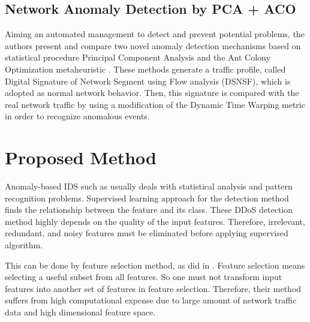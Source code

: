 \documentclass[a4paper]{article}
\begin{document}
%
%

\subsection{Network Anomaly Detection by PCA + ACO}
Aiming an automated management to detect and prevent potential problems, the authors present and compare two novel anomaly detection mechanisms based on statistical procedure Principal Component Analysis and the Ant Colony Optimization metaheuristic \cite{fernandes2016network}. These methods generate a traffic profile, called Digital Signature of Network Segment using Flow analysis (DSNSF), which is adopted as normal network behavior. Then, this signature is compared with the real network traffic by using a modification of the Dynamic Time Warping metric in order to recognize anomalous events. 
	
\section{Proposed Method}
Anomaly-based IDS such as \cite{thapngam2012ddos} usually deals with statistical analysis and pattern recognition problems. Supervised learning approach for the detection method finds the relationship between the feature and its class. These DDoS detection method highly depends on the quality of the input features. Therefore, irrelevant, redundant, and noisy features must be eliminated before applying supervised algorithm. 

This can be done by feature selection method, as did in \cite{aghdam2016feature}. Feature selection means selecting a useful subset from all features. So one must not transform input features into another set of features  in feature selection. Therefore, their method suffers from high computational expense due to large amount of network traffic data and high dimensional feature space.

\end{document}

